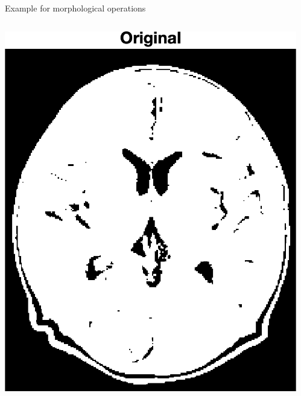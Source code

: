 \begin{frame}{Example for morphological operations}
    \begin{columns}[onlytextwidth,T]
        \begin{column}{0.40\textwidth}
            \centering{}
            \includegraphics[height=0.70\textheight]{images/brain_t50_0_original.png}
        \end{column}
        \begin{column}{0.40\textwidth}
            \centering{}

\end{column}
\end{columns}
\end{frame}
